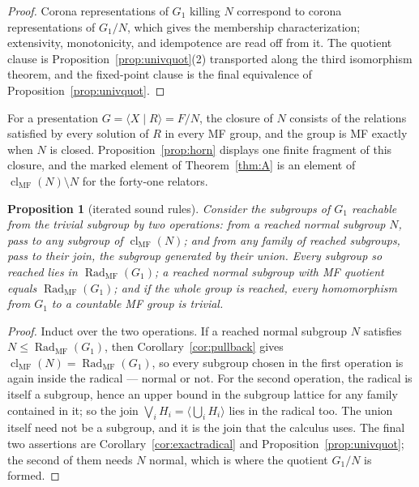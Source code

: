 \documentclass[11pt]{amsart}
\newcommand{\leanverified}[2]{\ignorespaces}
\newtheorem{proposition}[theorem]{Proposition}
\theoremstyle{definition}
\theoremstyle{remark}
\theoremstyle{plain}
\begin{document}
\begin{proof}
Corona representations of $G_1$ killing $N$ correspond to corona
representations of $G_1/N$, which gives the membership
characterization; extensivity, monotonicity, and idempotence are read
off from it.  The quotient clause is Proposition~\ref{prop:univquot}(2)
transported along the third isomorphism theorem, and the fixed-point
clause is the final equivalence of Proposition~\ref{prop:univquot}.
\end{proof}

For a presentation $G=\langle X\mid R\rangle=F/N$, the closure of $N$
consists of the relations satisfied by every solution of $R$ in every
MF group, and the group is MF exactly when $N$ is closed.
Proposition~\ref{prop:horn} displays one finite fragment of this
closure, and the marked element of Theorem~\ref{thm:A} is an element of
$\operatorname{cl}_{\mathrm{MF}}(N)\setminus N$ for the forty-one
relators.

\begin{proposition}[iterated sound rules]\label{prop:sounditeration}
Consider the subgroups of $G_1$ reachable from the trivial subgroup by
two operations: from a reached \emph{normal} subgroup $N$, pass to any
subgroup of $\operatorname{cl}_{\mathrm{MF}}(N)$; and from any family
of reached subgroups, pass to their join, the subgroup generated by
their union.  Every subgroup so reached lies in
$\operatorname{Rad}_{\mathrm{MF}}(G_1)$; a reached \emph{normal}
subgroup with MF
quotient equals $\operatorname{Rad}_{\mathrm{MF}}(G_1)$; and if the
whole group is reached, every homomorphism from $G_1$ to a countable MF
group is trivial.
\leanverified{Sofic/MFRelationClosure}{GroupApproximation.manuscriptSoundIterationClosure}
\end{proposition}

\begin{proof}
Induct over the two operations.  If a reached normal subgroup $N$
satisfies $N\le\operatorname{Rad}_{\mathrm{MF}}(G_1)$, then
Corollary~\ref{cor:pullback} gives
$\operatorname{cl}_{\mathrm{MF}}(N)=\operatorname{Rad}_{\mathrm{MF}}(G_1)$,
so every subgroup chosen in the first operation is again inside the
radical --- normal or not.  For the second operation, the radical is
itself a subgroup, hence an upper bound in the subgroup lattice for any
family contained in it; so the join $\bigvee_iH_i=\langle\bigcup_iH_i\rangle$
lies in the radical too.  The union itself need not be a subgroup, and
it is the join that the calculus uses.  The final two assertions are
Corollary~\ref{cor:exactradical} and Proposition~\ref{prop:univquot};
the second of them needs $N$ normal, which is where the quotient
$G_1/N$ is formed.
\end{proof}
\end{document}
